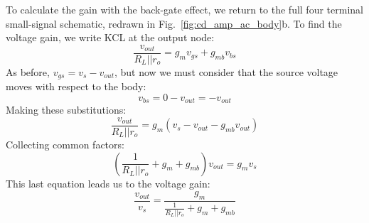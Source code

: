 To calculate the gain with the back-gate effect, we return to the full four terminal small-signal schematic, redrawn in Fig.~\ref{fig:cd_amp_ac_body}b.  To find the voltage gain, we write KCL at the output node: 
    \begin{equation}
        \frac{{{v_{out}}}}{{{R_L}||{r_o}}} = {g_m}{v_{gs}} + g_{mb} v_{bs} 
    \end{equation}
As before, $v_{gs} = v_{s} - v_{out}$, but now we must consider that the source voltage moves with respect to the body:
    \begin{equation}
        v_{bs} = 0 - v_{out} = -v_{out}
    \end{equation}
Making these substitutions:
    \begin{equation}
        \frac{{{v_{out}}}}{{{R_L}||{r_o}}} = {g_m}\left( {{v_{s}} - {v_{out}}}  - g_{mb} v_{out} \right)
    \end{equation}
Collecting common factors:
    \begin{equation}
        \left( {\frac{1}{{{R_L}||{r_o}}} + {g_m} + g_{mb} } \right){v_{out}} = {g_m}{v_{s}}
    \end{equation}
This last equation leads us to the voltage gain:
    \begin{equation}
        \frac{{{v_{out}}}}{{{v_{s}}}} = \frac{{{g_m}}}{{\frac{1}{{{R_L}||{r_o}}} + {g_m} + g_{mb}}}
    \end{equation}
